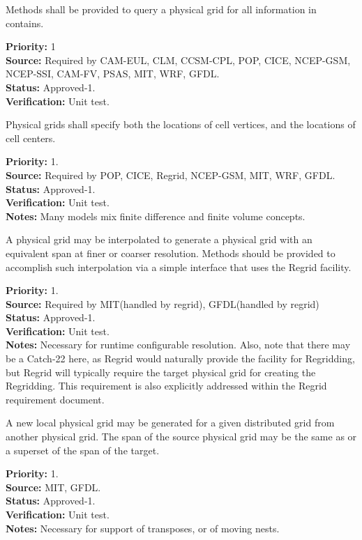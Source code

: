 Methods shall be provided to query a physical grid for all information in contains.
\begin{reqlist}
{\bf Priority:} 1\\
{\bf Source:} Required by CAM-EUL, CLM, CCSM-CPL, POP, CICE, NCEP-GSM, NCEP-SSI,
              CAM-FV, PSAS, MIT, WRF, GFDL. \\
{\bf Status:} Approved-1. \\
{\bf Verification:} Unit test.
\end{reqlist}

Physical grids shall specify both the locations of cell vertices, and the locations
of cell centers.
\begin{reqlist}
{\bf Priority:} 1. \\
{\bf Source:} Required by POP, CICE, Regrid, NCEP-GSM, MIT, WRF, GFDL. \\
{\bf Status:} Approved-1. \\
{\bf Verification:} Unit test.\\
{\bf Notes:} Many models mix finite difference and finite volume concepts.
\end{reqlist}

A physical grid may be interpolated to generate a physical grid with an equivalent span
 at finer or coarser resolution.  Methods should be provided to accomplish such
interpolation via a simple interface that uses the Regrid facility.
\begin{reqlist}
{\bf Priority:} 1. \\
{\bf Source:} Required by MIT(handled by regrid), GFDL(handled by regrid) \\
{\bf Status:} Approved-1. \\
{\bf Verification:} Unit test.\\
{\bf Notes:} Necessary for runtime configurable resolution.  Also, note that 
there may be a Catch-22 here, as Regrid would naturally provide the facility
for Regridding, but Regrid will typically require the target physical grid for
creating the Regridding.  This requirement is also explicitly addressed within the
Regrid requirement document.
\end{reqlist}

A new local physical grid may be generated for a given distributed grid from another 
physical grid.
The span of the source physical grid may be the same as or a superset of
the span of the target.
\begin{reqlist}
{\bf Priority:} 1. \\
{\bf Source:} MIT, GFDL. \\
{\bf Status:} Approved-1. \\
{\bf Verification:} Unit test.\\
{\bf Notes:} Necessary for support of transposes, or of moving nests.
\end{reqlist}

